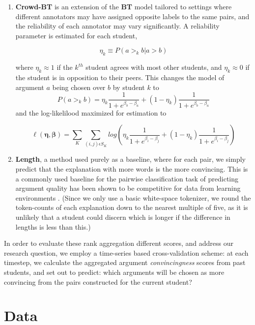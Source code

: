\documentclass[sigconf]{acmart}
\begin{document}
\begin{enumerate}
	\item \textbf{Crowd-BT} \cite{chen_pairwise_2013} is an extension of the 
	\textbf{BT} model tailored to settings where different annotators may have 
	assigned opposite labels to the same pairs, and the reliability of each 
	annotator may vary significantly. 
	A reliability parameter is estimated for each student, 
	
	$$
	\eta_k \equiv P(a >_k b | a >b )
	$$

	where $\eta_k \approx 1$ if the $k^{th}$ student agrees with most other 
	students, and $\eta_k \approx 0$ if the student is in opposition to their 
	peers.
	This changes the model of argument $a$ being chosen over $b$ by student $k$ 
	to 
	$$
	P(a >_k b) = 
	\eta_k \frac{1}{1+e^{\beta_b-\beta_a}} + (1-\eta_k) 
	\frac{1}{1+e^{\beta_b-\beta_a}}
	$$
	and the log-likelilood maximized for estimation to 
	
	$$
	\ell(\boldsymbol{\eta},\boldsymbol{\beta})=\sum_{K}\sum_{(i,j)\epsilon 
	S_K}^{} 
	log(\eta_k\frac{1}{1+e^{\beta_i - \beta_j}} + 
	(1-\eta_k)\frac{1}{1+e^{\beta_i - \beta_j}})
	$$
	
	\item \textbf{Length}, a method used purely as a baseline, where for each 
	pair, we simply predict that the explanation with more words is the more 
	convincing.
	This is a commonly used baseline  for the pairwise classification task of 
	predicting argument quality \cite{toledo_automatic_2019} has been shown to 
	be competitive for data from learning environments 
	\cite{bhatnagar_learnersourcing_2020}.
	(Since we only use a basic white-space tokenizer, we round the token-counts 
	of each explanation down to the nearest multiple of five, as it is unlikely 
	that a student could discern which is longer if the difference in lengths 
	is less than this.)
\end{enumerate}

In order to evaluate these rank aggregation different scores, and address 
our research question, we employ a time-series based cross-validation scheme:
at each timestep, we calculate the aggregated argument \textit{convincingness} 
scores from past students, and set out to predict: which arguments will be 
chosen as more convincing from the pairs constructed for the current student?  




\section{Data}
\end{document}
